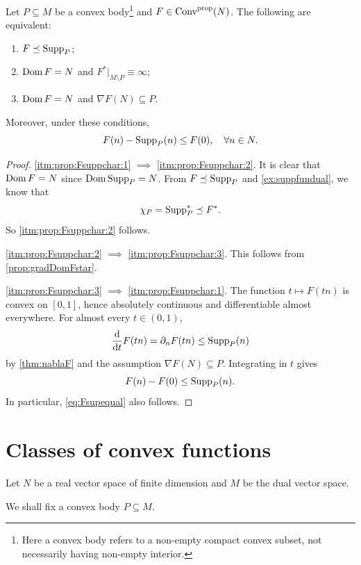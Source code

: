 \begin{proposition}\label{prop:Fsuppchar}
    Let $P\subseteq M$ be a convex body\footnote{Here a convex body refers to a non-empty compact convex subset, not necessarily having non-empty interior.} and $F\in \mathrm{Conv}^{\mathrm{prop}}(N)$. The following are equivalent:
    \begin{enumerate}
        \item\label{itm:prop:Fsuppchar:1} $F\preceq \operatorname{Supp}_P$;
        \item\label{itm:prop:Fsuppchar:2} $\operatorname{Dom} F=N$ and $F^*|_{M\setminus P}\equiv \infty$;
        \item\label{itm:prop:Fsuppchar:3} $\operatorname{Dom} F=N$ and $\nabla F(N)\subseteq P$.
    \end{enumerate}
    Moreover, under these conditions,
    \begin{equation}\label{eq:Fsupequal}
    F(n)-\operatorname{Supp}_P(n)\leq F(0),\quad \forall n\in N.
    \end{equation}
\end{proposition}
\begin{proof}
    \ref{itm:prop:Fsuppchar:1} $\implies$ \ref{itm:prop:Fsuppchar:2}. It is clear that $\operatorname{Dom} F=N$ since $\operatorname{Dom} \operatorname{Supp}_P=N$.
    From $F\preceq \operatorname{Supp}_P$ and \cref{ex:suppfundual}, we know that
    \[
    \chi_P=\operatorname{Supp}_P^*\preceq F^*.
    \]
    So \ref{itm:prop:Fsuppchar:2} follows.

    \ref{itm:prop:Fsuppchar:2} $\implies$ \ref{itm:prop:Fsuppchar:3}. This follows from \cref{prop:gradDomFstar}.

    \ref{itm:prop:Fsuppchar:3} $\implies$ \ref{itm:prop:Fsuppchar:1}. The function $t\mapsto F(tn)$ is convex on $[0,1]$, hence absolutely continuous and differentiable almost everywhere. For almost every $t\in(0,1)$,
    \[
        \frac{\mathrm d}{\mathrm dt}F(tn)=\partial_n F(tn) \leq \operatorname{Supp}_P(n)
    \]
    by \cref{thm:nablaF} and the assumption $\nabla F(N)\subseteq P$. Integrating in $t$ gives
    \[
        F(n)-F(0)\leq \operatorname{Supp}_P(n).
    \]
    In particular, \eqref{eq:Fsupequal} also follows.
\end{proof}


\section{Classes of convex functions}
\label{sec:convex_classes}
Let $N$ be a real vector space of finite dimension and $M$ be the dual vector space.

We shall fix a convex body $P\subseteq M$.


